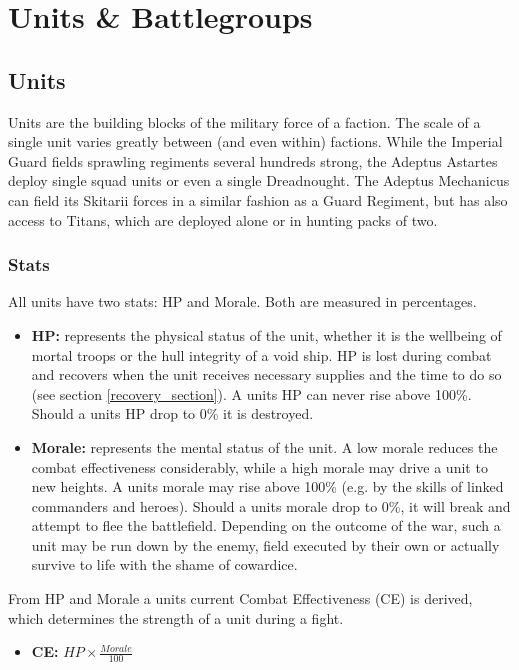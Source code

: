 \chapter{Units \& Battlegroups}
\section{Units}
Units are the building blocks of the military force of a faction. The scale of a single unit varies greatly between (and even within) factions. While the Imperial Guard fields sprawling regiments several hundreds strong, the Adeptus Astartes deploy single squad units or even a single Dreadnought. The Adeptus Mechanicus can field its Skitarii forces in a similar fashion as a Guard Regiment, but has also access to Titans, which are deployed alone or in hunting packs of two.

\subsection{Stats}
All units have two stats: HP and Morale. Both are measured in percentages.
\begin{itemize}
	\item \textbf{HP:} represents the physical status of the unit, whether it is the wellbeing of mortal troops or the hull integrity of a void ship. HP is lost during combat and recovers when the unit receives necessary supplies and the time to do so (see section \ref{recovery_section}). A units HP can never rise above 100\%. Should a units HP drop to 0\% it is destroyed.
	\item \textbf{Morale:} represents the mental status of the unit. A low morale reduces the combat effectiveness considerably, while a high morale may drive a unit to new heights. A units morale may rise above 100\% (e.g. by the skills of linked commanders and heroes). Should a units morale drop to 0\%, it will break and attempt to flee the battlefield. Depending on the outcome of the war, such a unit may be run down by the enemy, field executed by their own or actually survive to life with the shame of cowardice. 
\end{itemize}
From HP and Morale a units current Combat Effectiveness	(CE) is derived, which determines the strength of a unit during a fight.
\begin{itemize}
	\item \textbf{CE:} $HP \times \frac{Morale}{100}$
\end{itemize}

